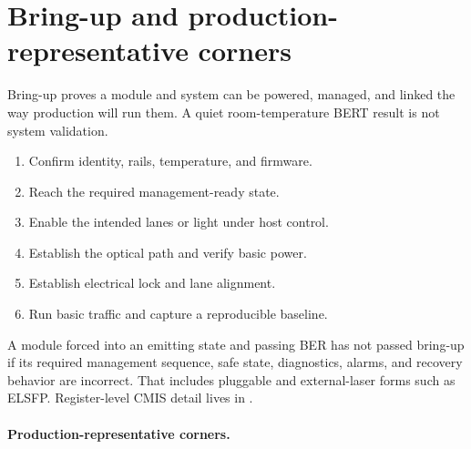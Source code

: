 
\section{Bring-up and production-representative corners}
\label{sec:bringup}

Bring-up proves a module and system can be powered, managed, and linked the way
production will run them. A quiet room-temperature BERT result is not system
validation.

\begin{enumerate}
\item Confirm identity, rails, temperature, and firmware.
\item Reach the required management-ready state.
\item Enable the intended lanes or light under host control.
\item Establish the optical path and verify basic power.
\item Establish electrical lock and lane alignment.
\item Run basic traffic and capture a reproducible baseline.
\end{enumerate}

A module forced into an emitting state and passing BER has not passed bring-up
if its required management sequence, safe state, diagnostics, alarms, and
recovery behavior are incorrect. That includes pluggable and external-laser
forms such as
ELSFP.
Register-level CMIS detail lives in
.

\paragraph{Production-representative corners.}
\label{sec:prod-corners}

